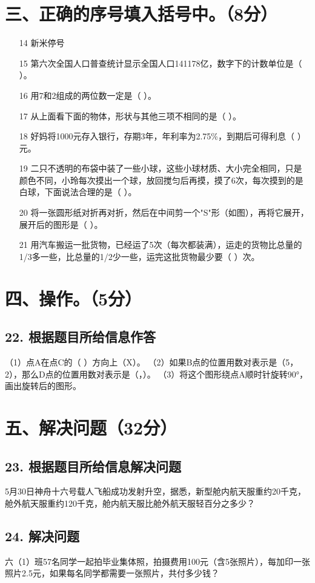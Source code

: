 \documentclass[12pt]{article}
\begin{document}
\section*{三、正确的序号填入括号中。（8分）}
\begin{enumerate}
    \item[14] 新米停号
    \item[15] 第六次全国人口普查统计显示全国人口141178亿，数字下的计数单位是（ ）。
    \item[16] 用7和2组成的两位数一定是（ ）。
    \item[17] 从上面看下面的物体，形状与其他三项不相同的是（ ）。
    \item[18] 好妈将1000元存入银行，存期3年，年利率为2.75\%，到期后可得利息（ ）元。
    \item[19] 二只不透明的布袋中装了一些小球，这些小球材质、大小完全相同，只是颜色不同，小玲每次摸出一个球，放回搅匀后再摸，摸了6次，每次摸到的是白球，下面说法合理的是（ ）。
    \item[20] 将一张圆形纸对折再对折，然后在中间剪一个"S"形（如图），再将它展开，展开后的图形是（ ）。
    \item[21] 用汽车搬运一批货物，已经运了5次（每次都装满），运走的货物比总量的1/3多一些，比总量的1/2少一些，运完这批货物最少要（ ）次。
\end{enumerate}

\section*{四、操作。（5分）}
\subsection*{22. 根据题目所给信息作答}
（1）点A在点C的（ ）方向上（X）。
（2）如果B点的位置用数对表示是（5，2），那么D点的位置用数对表示是（，）。
（3）将这个图形绕点A顺时针旋转90°，画出旋转后的图形。

\section*{五、解决问题（32分）}
\subsection*{23. 根据题目所给信息解决问题}
5月30日神舟十六号载人飞船成功发射升空，据悉，新型舱内航天服重约20千克，舱外航天服重约120千克，舱内航天服比舱外航天服轻百分之多少？

\subsection*{24. 解决问题}
六（1）班57名同学一起拍毕业集体照，拍摄费用100元（含5张照片），每加印一张照片2.5元，如果每名同学都需要一张照片，共付多少钱？
\end{document}
